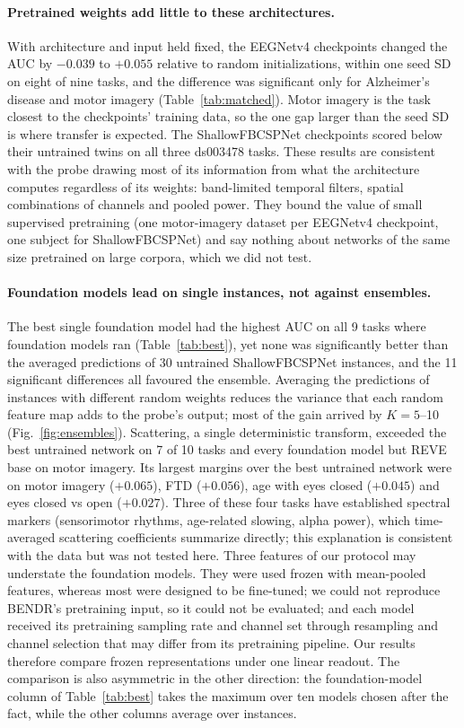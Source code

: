 \documentclass[11pt]{article}
\begin{document}
\paragraph{Pretrained weights add little to these architectures.} With architecture and input held
fixed, the EEGNetv4 checkpoints changed the AUC by $-0.039$ to $+0.055$ relative to random
initializations, within one seed SD on eight of nine tasks, and the difference was significant only
for Alzheimer's disease and motor imagery (Table~\ref{tab:matched}). Motor imagery is the task
closest to the checkpoints' training data, so the one gap larger than the seed SD is where transfer
is expected. The ShallowFBCSPNet checkpoints scored below their untrained twins on all three
ds003478 tasks. These results are consistent with the probe drawing most of its information from
what the architecture computes regardless of its weights: band-limited temporal filters, spatial
combinations of channels and pooled power. They bound the value of small supervised pretraining (one
motor-imagery dataset per EEGNetv4 checkpoint, one subject for ShallowFBCSPNet) and say nothing
about networks of the same size pretrained on large corpora, which we did not test.

\paragraph{Foundation models lead on single instances, not against ensembles.} The best single
foundation model had the highest AUC on all 9 tasks where foundation models ran
(Table~\ref{tab:best}), yet none was significantly better than the averaged predictions of 30
untrained ShallowFBCSPNet instances, and the 11 significant differences all favoured the ensemble.
Averaging the predictions of instances with different random weights reduces the variance that each
random feature map adds to the probe's output; most of the gain arrived by $K = 5$--10
(Fig.~\ref{fig:ensembles}). Scattering, a single deterministic transform, exceeded the best untrained
network on 7 of 10 tasks and every foundation model but REVE base on motor imagery. Its largest margins over the
best untrained network were on motor imagery ($+0.065$), FTD ($+0.056$), age with eyes closed
($+0.045$) and eyes closed vs open ($+0.027$). Three of these four tasks have established spectral
markers (sensorimotor rhythms, age-related slowing, alpha power), which time-averaged scattering
coefficients summarize directly; this explanation is consistent with the data but was not tested
here.
Three features of our protocol may understate the foundation models. They were used frozen with
mean-pooled features, whereas most were designed to be fine-tuned; we could not reproduce
BENDR's pretraining input, so it could not be evaluated; and each model
received its pretraining sampling rate and channel set
through resampling and channel selection that may differ from its pretraining pipeline. Our results
therefore compare frozen representations under one linear readout. The comparison is also
asymmetric in the other direction: the foundation-model column of Table~\ref{tab:best} takes the
maximum over ten models chosen after the fact, while the other columns average over instances.
\end{document}
